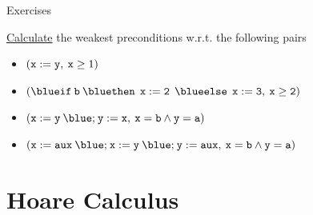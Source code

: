 \documentclass{beamer}
\begin{document}
\begin{frame}{Exercises}
        
        \alert{\underline{Calculate}} the weakest preconditions w.r.t. the following pairs
        \\[7pt]
        \begin{itemize}
                \item $(\mathtt{x := y}, \>  \mathtt{x} \geq 1)$
                        \\[7pt]
                \item $(\prog{{\blue if} \>  b \> {\blue then} \> \> 
                        x:=2 \> \> {\blue else} \> \> x:= 3}, \> \prog{x \geq 2})$
                        \\[7pt]
                \item $(\prog{x:= y \> {\blue ;} \> y := x}, \> \prog{ x = b \wedge y = a })$
                        \\[7pt]
                \item $(\prog{x:= aux \> {\blue ;} \> 
                        x:= y \> {\blue ;} \> y := aux}, \> \prog{ x = b \wedge y = a })$
        \end{itemize}
\end{frame}

\section{Hoare Calculus}



\end{document}
